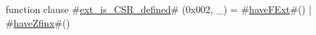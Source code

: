 function clause #\hyperref[sailRISCVzextzyiszyCSRzydefined]{ext\_is\_CSR\_defined}# (0x002, _) = #\hyperref[sailRISCVzhaveFExt]{haveFExt}#() | #\hyperref[sailRISCVzhaveZfinx]{haveZfinx}#()
